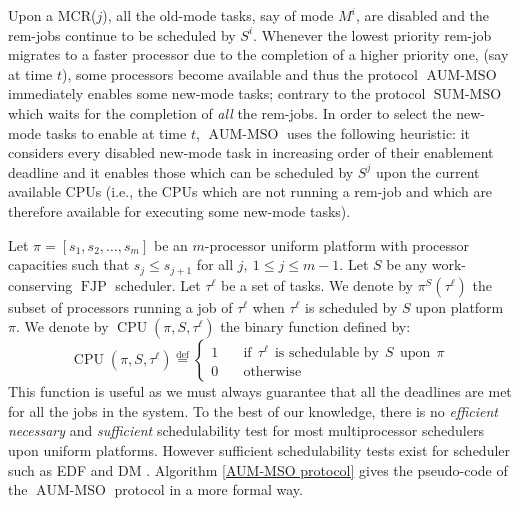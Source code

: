 \documentclass[10pt,english,a4paper]{article}
\newcommand{\equals}{\stackrel{\mathrm{def}}{=}}
\newtheorem{validity test}{Validity Test}
\newcommand{\FJP}{\operatorname{FJP}}
\newcommand{\SUMMSO}{\operatorname{SUM-MSO}}
\newcommand{\AUMMSO}{\operatorname{AUM-MSO}}
\newcommand{\CPU}{\operatorname{CPU}}
\begin{document}
Upon a MCR($j$), all the old-mode tasks, say of mode $M^i$, are disabled and the rem-jobs continue to be scheduled by $S^i$. Whenever the lowest priority rem-job migrates to a faster processor due to the completion of a higher priority one, (say at time $t$), some processors become available and thus the protocol $\AUMMSO$ immediately enables some new-mode tasks; contrary to the protocol $\SUMMSO$ which waits for the completion of {\em all} the rem-jobs. In order to select the new-mode tasks to enable at time $t$, $\AUMMSO$ uses the following heuristic: it considers every disabled new-mode task in increasing order of their enablement deadline and it enables those which can be scheduled by $S^j$ upon the current available CPUs (i.e., the CPUs which are not running a rem-job and which are therefore available for executing some new-mode tasks). 

Let $\pi = [s_1, s_2, \ldots, s_m]$ be an $m$-processor uniform platform with processor capacities such that $s_j \le s_{j+1}$ for all $j, \: 1 \le j \le m-1$. Let $S$ be any work-conserving $\FJP$ scheduler. Let $\tau^\ell$ be a set of tasks. 
We denote by $\pi^S(\tau^\ell)$ the subset of processors running a job of $\tau^\ell$ when $\tau^\ell$ is scheduled by $S$ upon platform $\pi$. 
We denote by $\CPU(\pi, S, \tau^\ell)$ the binary function defined by:
\[
\CPU(\pi, S, \tau^\ell) \equals
  \left\{
          \begin{array}{ll}
	   1 & \quad \mathrm{if} \:\: \tau^\ell \:\: \mbox{is schedulable by} \:\: S \:\: \mbox{upon} \:\: \pi \\
            0 & \quad \mathrm{otherwise}
         \end{array}
 \right.
 \]
This function is useful as we must always guarantee that all the deadlines are met for all the jobs in the system. To the best of our knowledge, there is no {\em efficient necessary} and {\em sufficient} schedulability test for most multiprocessor schedulers upon uniform platforms. However sufficient schedulability tests exist for scheduler such as EDF and DM \cite{BaJo08_1, BaJo08_2}. Algorithm \ref{AUM-MSO protocol} gives the pseudo-code of the $\AUMMSO$ protocol in a more formal way.
\end{document}
